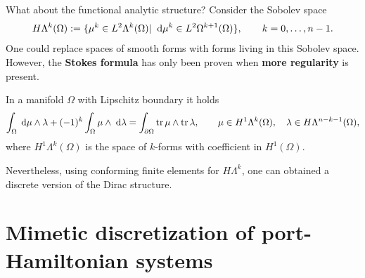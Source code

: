 \documentclass[aspectratio=169]{beamer}
\DeclareMathOperator{\tr}{tr}
\begin{document}
\begin{frame}{What about the functional analytic structure?}
Consider the Sobolev space
\begin{equation*}
	H\Lambda^k(\Omega) := \{\mu^k \in L^2 \Lambda^k(\Omega) \vert \; \d{\mu^k} \in L^2 \Omega^{k+1}(\Omega)\}, \qquad k=0, \dots, n-1.
\end{equation*}
One could replace spaces of smooth forms with forms living in this Sobolev space. \\
However, the \textbf{Stokes formula} has only been proven when \textbf{more regularity} is present.
\begin{theorem}
	In a manifold $\Omega$ with Lipschitz boundary it holds
	\begin{equation*}
		\int_\Omega \d{\mu} \wedge \lambda + (-1)^k \int_\Omega \mu \wedge \d{\lambda} = \int_{\partial \Omega}\tr {\mu} \wedge \tr{\lambda}, \qquad \mu \in H^1\Lambda^{k}(\Omega), \quad \lambda \in H \Lambda^{n-k-1}(\Omega),
	\end{equation*}
	where $H^1\Lambda^k(\Omega)$ is the space of $k$-forms with coefficient in $H^1(\Omega)$.
\end{theorem}

Nevertheless, using conforming finite elements for $H\Lambda^k$, one can obtained a discrete version of the Dirac structure.

\end{frame}

\section{Mimetic discretization of port-Hamiltonian systems}
\end{document}
